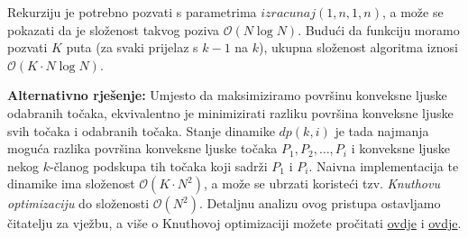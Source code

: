 Rekurziju je potrebno pozvati s parametrima $izracunaj(1, n, 1, n)$, a može se
pokazati da je složenost takvog poziva $\mathcal{O}(N \log N)$. Budući da funkciju
moramo pozvati $K$ puta (za svaki prijelaz s $k-1$ na $k$), ukupna složenost
algoritma iznosi $\mathcal{O}(K \cdot N \log N)$.

\textbf{Alternativno rješenje:} Umjesto da maksimiziramo površinu konveksne
ljuske odabranih točaka, ekvivalentno je minimizirati razliku površina konveksne
ljuske svih točaka i odabranih točaka. Stanje dinamike $dp(k, i)$ je tada
najmanja moguća razlika površina konveksne ljuske točaka $P_1, P_2, \dots, P_i$
i konveksne ljuske nekog $k$-članog podskupa tih točaka koji sadrži $P_1$ i
$P_i$. Naivna implementacija te dinamike ima složenost $\mathcal{O}(K \cdot
N^2)$, a može se ubrzati koristeći tzv. \textit{Knuthovu optimizaciju} do
složenosti $\mathcal{O}(N^2)$. Detaljnu analizu ovog pristupa ostavljamo
čitatelju za vježbu, a više o Knuthovoj optimizaciji možete pročitati
\href{https://jeffreyxiao.me/blog/knuths-optimization}{ovdje} i
\href{https://wiki.algo.is/Knuth's\%20optimization}{ovdje}.

